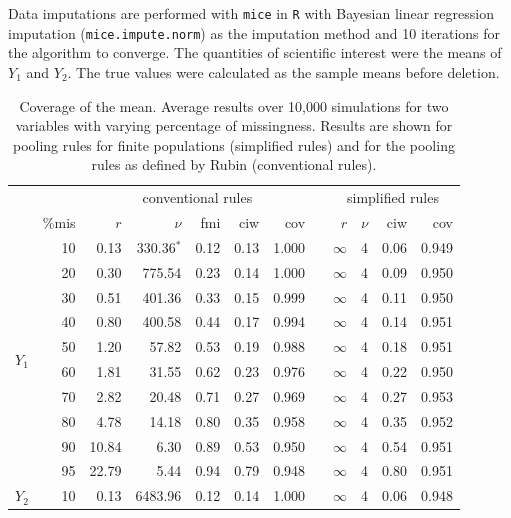 \documentclass[12pt, a4paper]{article}
\begin{document}
 Data imputations are performed with \texttt{mice} \cite[version 2.21]{vanbuuren2010} in \texttt{R} \citep[version 3.0.2]{R} with Bayesian linear regression imputation (\texttt{mice.impute.norm}) as the imputation method and 10 iterations for the algorithm to converge. The quantities of scientific interest were the means of $Y_1$ and $Y_2$. The true values were calculated as the sample means before deletion. 
\begin{table}[b!]
\caption{Coverage of the mean. Average results over 10,000 simulations for two variables with varying percentage of missingness. Results are shown for pooling rules for finite populations (simplified rules) and for the pooling rules as defined by Rubin (conventional rules).}
\centering

\begin{tabular}{lrrrrrrrrrrr}
  \hline
 & &\multicolumn{5}{c}{conventional rules}&&\multicolumn{4}{c}{simplified rules}\\ \cline{3-7} \cline{9-12}
 & \%mis & $r$ & $\nu$ & fmi & ciw & cov&& $r$ & $\nu$ & ciw & cov \\ 
  \hline
\multirow{10}{*}{$Y_1$}
   & 10 & 0.13 & 330.36$^*$ & 0.12 & 0.13& 1.000	&& $\infty$ & 4 & 0.06 & 0.949\\  %
   & 20 &  0.30 & 775.54 & 0.23 & 0.14 & 1.000    	&&  $\infty$ & 4 &  0.09 & 0.950 \\ 
   & 30 & 0.51 & 401.36 & 0.33 & 0.15 & 0.999  		&&  $\infty$ & 4 &  0.11 & 0.950  \\ 
   & 40 & 0.80 & 400.58 & 0.44 & 0.17 & 0.994  		&&  $\infty$ & 4 &  0.14 & 0.951  \\ 
   & 50 & 1.20 & 57.82 & 0.53 & 0.19 & 0.988     	&&  $\infty$ & 4 &  0.18 & 0.951 \\ 
   & 60 & 1.81 & 31.55 & 0.62 & 0.23 & 0.976    		&&  $\infty$ & 4 &  0.22 & 0.950 \\ 
   & 70 & 2.82 & 20.48 & 0.71 & 0.27 & 0.969    	 	&&  $\infty$ & 4 &  0.27 & 0.953 \\ 
   & 80 & 4.78 & 14.18 & 0.80 & 0.35 & 0.958     	&&  $\infty$ & 4 &  0.35 & 0.952 \\ 
   & 90 & 10.84 & 6.30 & 0.89 & 0.53 & 0.950     	&&  $\infty$ & 4 &  0.54 & 0.951 \\ 
   & 95 & 22.79 & 5.44 & 0.94 & 0.79 & 0.948     	&&  $\infty$ & 4 &  0.80 & 0.951 \\ \cline{2-12}
\multirow{10}{*}{$Y_2$}
   & 10 & 0.13 & 6483.96 & 0.12 & 0.14 & 1.000  	&&  $\infty$ & 4 &  0.06 & 0.948   \\ 

\end{tabular}
\end{table}
\end{document}
